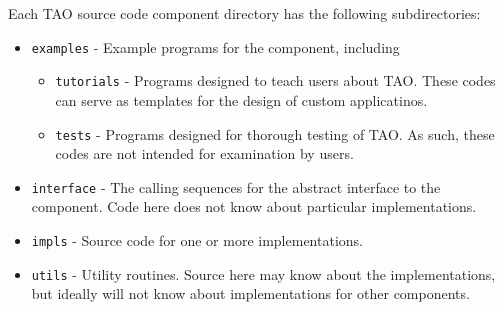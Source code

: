 \noindent
Each TAO source code component directory has the following subdirectories:
\begin{itemize}
\item  \texttt{examples} - Example programs for the component, including
  \begin{itemize}
  \item \texttt{tutorials} - Programs designed to teach users about TAO.  These
          codes can serve as templates for the design of custom applicatinos.
  \item \texttt{tests} - Programs designed for thorough testing of TAO.  As such,
          these codes are not intended for examination by users.
  \end{itemize}
\item  \texttt{interface} - The calling sequences for the abstract interface  
        to the component.
        Code here does not know about particular implementations.
\item  \texttt{impls} - Source code for one or more implementations.
\item  \texttt{utils} - Utility routines.  Source here may know about the 
          implementations, but ideally will not know about implementations
          for other components.
\end{itemize}

